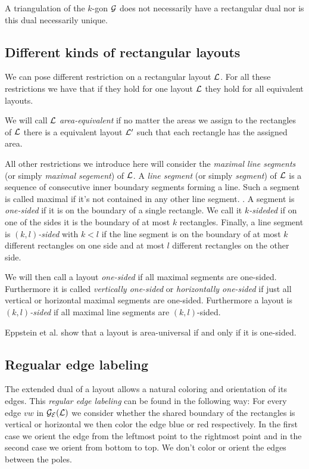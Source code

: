   A triangulation of the $k$-gon $\mathcal{G}$ does not necessarily have a rectangular dual nor is this dual necessarily unique.

\subsection{Different kinds of rectangular layouts}
  We can pose different restriction on a rectangular layout $\mathcal{L}$. For all these restrictions we have that if they hold for one layout $\mathcal{L}$ they hold for all equivalent layouts.

  We will call $\mathcal{L}$ \emph{area-equivalent} if no matter the areas we assign to the rectangles of $\mathcal{L}$ there is a equivalent layout $\mathcal{L}'$ such that each rectangle has the assigned area.

  All other restrictions we introduce here will consider the \emph{maximal line segments} (or simply \emph{maximal segement}) of $\mathcal{L}$. A \emph{line segment} (or simply \emph{segment}) of $\mathcal{L}$ is a sequence of consecutive inner boundary segments forming a line. Such a segment is called maximal if it's not contained in any other line segment. . A segment is \emph{one-sided} if it is on the boundary of a single rectangle. We call it \emph{$k$-sideded} if on one of the sides it is the boundary of at most $k$ rectangles. Finally, a line segment is \emph{$(k,l)$-sided} with $k<l$ if the line segment is on the boundary of at most $k$ different rectangles on one side and at most $l$ different rectangles on the other side.

  We will then call a layout \emph{one-sided} if all maximal segments are one-sided. Furthermore it is called \emph{vertically one-sided} or \emph{horizontally one-sided} if just all vertical or horizontal maximal segments are one-sided. Furthermore a layout is \emph{$(k,l)$-sided} if all maximal line segments are $(k,l)$-sided.

  Eppstein et al. \cite{Eppstein2012} show that a layout is area-universal if and only if it is one-sided.

\subsection{Regualar edge labeling}
  The extended dual of a layout allows a natural coloring and orientation of its edges. This \emph{regular edge labeling} can be found in the following way:
  For every edge $vw$ in $\mathcal{G}_{\mathcal{E}}(\mathcal{L})$ we consider whether the shared boundary of the rectangles is vertical or horizontal we then color the edge blue or red respectively. In the first case we orient the edge from the  leftmost point to the rightmost point and in the second case we orient from bottom to top. We don't color or orient the edges between the poles.

